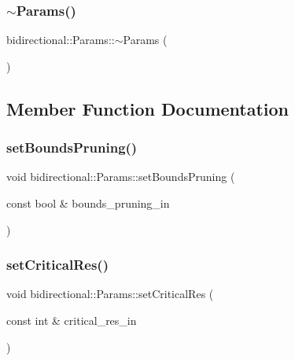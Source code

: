 \subsubsection{\texorpdfstring{$\sim$\+Params()}{~Params()}}
{\footnotesize\ttfamily bidirectional\+::\+Params\+::$\sim$\+Params (\begin{DoxyParamCaption}{ }\end{DoxyParamCaption})\hspace{0.3cm}{\ttfamily [inline]}}



\subsection{Member Function Documentation}
\mbox{\label{classbidirectional_1_1Params_adc2cc88c79856b8f6aed271b99c60bd2}} 
\subsubsection{\texorpdfstring{set\+Bounds\+Pruning()}{setBoundsPruning()}}
{\footnotesize\ttfamily void bidirectional\+::\+Params\+::set\+Bounds\+Pruning (\begin{DoxyParamCaption}\item[{const bool \&}]{bounds\+\_\+pruning\+\_\+in }\end{DoxyParamCaption})\hspace{0.3cm}{\ttfamily [inline]}}

\mbox{\label{classbidirectional_1_1Params_a4cb80c6a553af542ee696b63f031d547}} 
\subsubsection{\texorpdfstring{set\+Critical\+Res()}{setCriticalRes()}}
{\footnotesize\ttfamily void bidirectional\+::\+Params\+::set\+Critical\+Res (\begin{DoxyParamCaption}\item[{const int \&}]{critical\+\_\+res\+\_\+in }\end{DoxyParamCaption})\hspace{0.3cm}{\ttfamily [inline]}}

